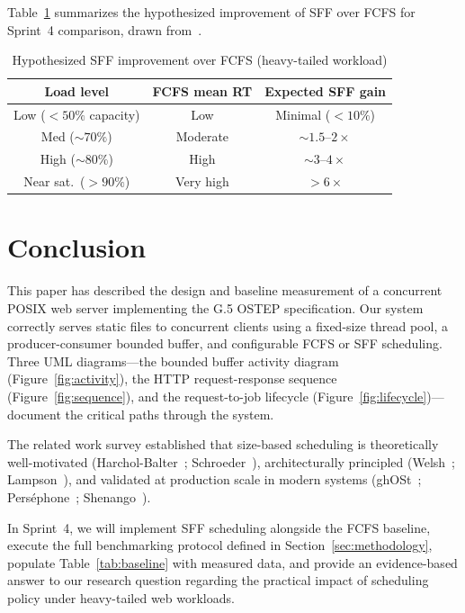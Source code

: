\documentclass[conference]{IEEEtran}
\begin{document}
Table~\ref{tab:expected} summarizes the hypothesized improvement of SFF over
FCFS for Sprint~4 comparison, drawn from~\cite{harchol2003}.

\begin{table}[h]
\centering
\caption{Hypothesized SFF improvement over FCFS (heavy-tailed workload)}
\label{tab:expected}
\begin{tabular}{@{}ccc@{}}
\toprule
\textbf{Load level} & \textbf{FCFS mean RT} & \textbf{Expected SFF gain} \\
\midrule
Low  ($<\!50\%$ capacity)  & Low       & Minimal ($<\!10\%$)        \\
Med  (${\sim}70\%$)        & Moderate  & ${\sim}1.5$--$2\times$     \\
High (${\sim}80\%$)        & High      & ${\sim}3$--$4\times$       \\
Near sat.\ ($>\!90\%$)     & Very high & $>\!6\times$               \\
\bottomrule
\end{tabular}
\end{table}

\section{Conclusion}
\label{sec:conclusion}

This paper has described the design and baseline measurement of a concurrent
POSIX web server implementing the G.5 OSTEP specification. Our system
correctly serves static files to concurrent clients using a fixed-size thread
pool, a producer-consumer bounded buffer, and configurable FCFS or SFF
scheduling. Three UML diagrams---the bounded buffer activity diagram
(Figure~\ref{fig:activity}), the HTTP request-response sequence
(Figure~\ref{fig:sequence}), and the request-to-job lifecycle
(Figure~\ref{fig:lifecycle})---document the critical paths through the system.

The related work survey established that size-based scheduling is theoretically
well-motivated (Harchol-Balter~\cite{harchol2003}; Schroeder~\cite{schroeder2006}),
architecturally principled (Welsh~\cite{welsh2001}; Lampson~\cite{lampson1983}),
and validated at production scale in modern systems
(ghOSt~\cite{ghost2021}; Perséphone~\cite{persephone2021};
Shenango~\cite{ousterhout2019}).

In Sprint~4, we will implement SFF scheduling alongside the FCFS baseline,
execute the full benchmarking protocol defined in
Section~\ref{sec:methodology}, populate Table~\ref{tab:baseline} with measured
data, and provide an evidence-based answer to our research question regarding
the practical impact of scheduling policy under heavy-tailed web workloads.
\end{document}
